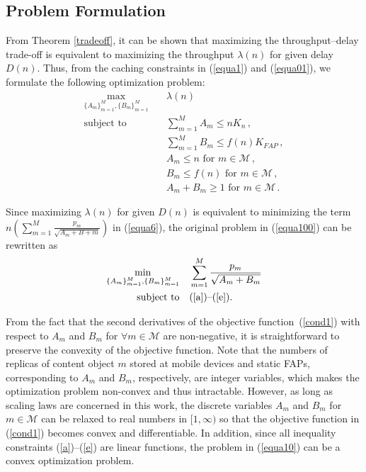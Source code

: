 \documentclass[10pt,journal,compsoc,onecolumn]{IEEEtran}
\begin{document}
\subsection{Problem Formulation}
From Theorem \ref{tradeoff}, it can be shown that maximizing the throughput--delay trade-off is equivalent to maximizing the throughput $\lambda(n)$ for given delay $D(n)$. Thus, from the caching constraints in (\ref{equa1}) and (\ref{equa01}), we formulate the following optimization problem:
\begin{subequations}
\label{equa100}
\begin{align}
   \underset{{{\lbrace{A_m\rbrace}}^M_{m=1},{\lbrace B_m \rbrace}^M_{m=1}}}{\max}
        & \quad \lambda(n)  \label{cond11}\\
    \text{subject to}
        & \quad \sum_{m=1}^{M} A_m \leq nK_n  \,, \label{a}\\
        & \quad \sum_{m=1}^{M} B_m \leq f(n)K_{FAP} \,, \label{b}\\
        & \quad A_m \leq n  \text{ for }  m \in \mathcal{M} \,, \label{c}\\
        & \quad B_m \leq f(n)   \text{ for }  m \in \mathcal{M} \,, \label{d}\\
        & \quad A_m + B_m  \geq 1  \text{ for }  m \in \mathcal{M} \,.\label{e}
\end{align}
\end{subequations}\par
Since maximizing $\lambda(n)$ for given $D(n)$ is equivalent to minimizing the term $n\left(\sum_{m=1}^M \frac{p_m}{\sqrt{A_m+B+m}}\right)$ in (\ref{equa6}), the original problem in (\ref{equa100}) can be rewritten as
\begin{subequations}
\label{equa10}
\begin{align}
    \min_{{\lbrace{A_m\rbrace}}^M_{m=1},{\lbrace B_m \rbrace}^M_{m=1}}
        & \quad \sum_{m=1}^{M} \frac{p_m}{\sqrt{A_m+B_m}}  \label{cond1}\\
    \text{subject to} & \quad \text{(\ref{a})--(\ref{e}).} \label{f}
\end{align}
\end{subequations}\par
From the fact that the second derivatives of the objective
function~(\ref{cond1}) with respect to $A_m$ and $B_m$ for
$\forall m \in \mathcal{M}$ are non-negative, it is
straightforward to preserve the convexity of the objective
function. Note that the numbers of replicas of content
object $m$ stored at mobile devices and static FAPs, corresponding to $A_m$ and
$B_m$, respectively, are integer variables, which makes the
optimization problem non-convex and thus intractable. However, as
long as scaling laws are concerned in this work, the discrete
variables $A_m$ and $B_m$ for $m \in \mathcal{M}$ can be relaxed
to real numbers in $[1,\infty)$ so that the objective function in
(\ref{cond1}) becomes convex and differentiable. In addition,
since all inequality constraints (\ref{a})--(\ref{e}) are linear
functions, the problem in (\ref{equa10}) can be a convex
optimization problem.
\end{document}
